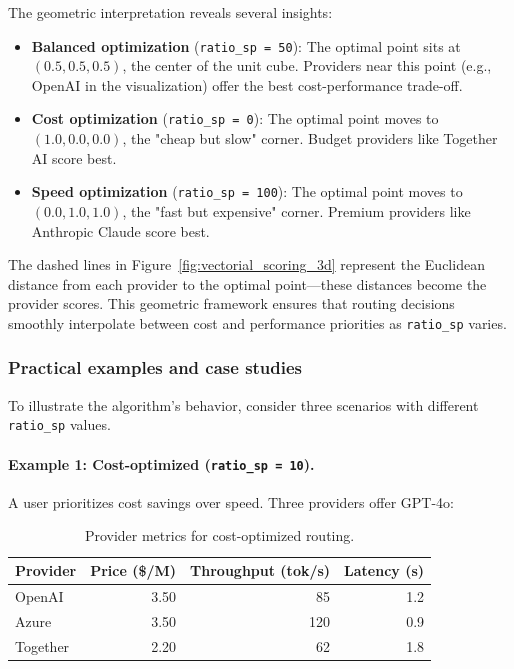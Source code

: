 \documentclass[english]{article}
\begin{document}
The geometric interpretation reveals several insights:
\begin{itemize}
    \item \textbf{Balanced optimization} (\texttt{ratio\_sp = 50}): The optimal point sits at $(0.5, 0.5, 0.5)$, the center of the unit cube. Providers near this point (e.g., OpenAI in the visualization) offer the best cost-performance trade-off.
    \item \textbf{Cost optimization} (\texttt{ratio\_sp = 0}): The optimal point moves to $(1.0, 0.0, 0.0)$, the "cheap but slow" corner. Budget providers like Together AI score best.
    \item \textbf{Speed optimization} (\texttt{ratio\_sp = 100}): The optimal point moves to $(0.0, 1.0, 1.0)$, the "fast but expensive" corner. Premium providers like Anthropic Claude score best.
\end{itemize}

The dashed lines in Figure~\ref{fig:vectorial_scoring_3d} represent the Euclidean distance from each provider to the optimal point—these distances become the provider scores. This geometric framework ensures that routing decisions smoothly interpolate between cost and performance priorities as \texttt{ratio\_sp} varies.

\subsubsection{Practical examples and case studies}

To illustrate the algorithm's behavior, consider three scenarios with different \texttt{ratio\_sp} values.

\paragraph{Example 1: Cost-optimized (\texttt{ratio\_sp = 10}).}

A user prioritizes cost savings over speed. Three providers offer GPT-4o:

\begin{table}[H]
\centering
\caption{Provider metrics for cost-optimized routing.}
\begin{tabular}{|l|r|r|r|}
\hline
\textbf{Provider} & \textbf{Price (\$/M)} & \textbf{Throughput (tok/s)} & \textbf{Latency (s)} \\
\hline
OpenAI & 3.50 & 85 & 1.2 \\
Azure & 3.50 & 120 & 0.9 \\
Together & 2.20 & 62 & 1.8 \\
\hline
\end{tabular}
\end{table}
\end{document}
